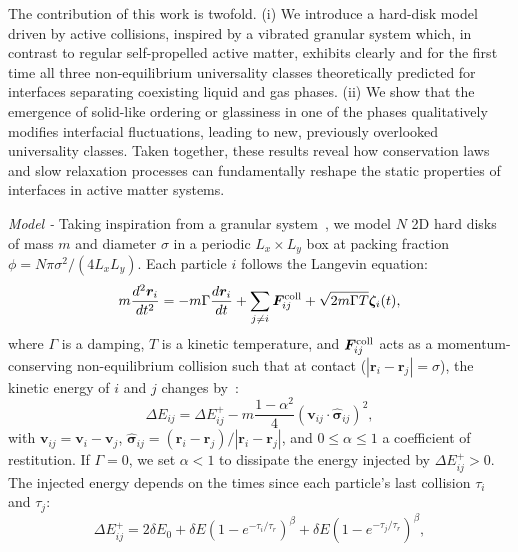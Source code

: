 \documentclass[aps,
reprint,
superscriptaddress,









amsmath,amssymb,floatfix,






prl
]{revtex4-2}
\begin{document}
The contribution of this work is twofold. (i) We introduce a hard-disk model driven by active collisions, inspired by a vibrated granular system which, in contrast to regular self-propelled active matter, exhibits clearly and for the first time all three non-equilibrium universality classes theoretically predicted for interfaces separating coexisting liquid and gas phases. (ii) We show that the emergence of solid-like ordering or glassiness in one of the phases qualitatively modifies interfacial fluctuations, leading to new, previously overlooked universality classes. Taken together, these results reveal how conservation laws and slow relaxation processes can fundamentally reshape the static properties of interfaces in active matter systems.

\emph{Model -} Taking inspiration from a granular system~\cite{maire2024non, maire2025dynamical}, we model $N$ 2D hard disks of mass $m$ and diameter $\sigma$ in a periodic $L_x\times L_y$ box at packing fraction $\phi = N\pi\sigma^2/(4L_xL_y)$. Each particle $i$ follows the Langevin equation:
\begin{equation}
m\dfrac{d^2\bm r_i}{dt^2}=-m\Gamma \dfrac{d\bm r_i}{dt} + \sum_{j\neq i}\bm F_{ij}^{\rm coll}+\sqrt{2m\Gamma T}\bm \zeta_i(t),
\label{eq: time evol}
\end{equation}
where $\Gamma$ is a damping, $T$ is a kinetic temperature, and $\bm F_{ij}^{\rm coll}$ acts as a momentum-conserving non-equilibrium collision such that at contact ($|\bm r_i - \bm r_j| = \sigma$), the kinetic energy of $i$ and $j$ changes by~\cite{risso2018effective, maire2025hyperuniform}:
\begin{equation}
\Delta E_{ij} = \Delta E_{ij}^+-m\dfrac{1-\alpha^2}{4}(\bm v_{ij}\cdot \hat{\bm\sigma}_{ij})^2,
\label{eq: energy change at collision}
\end{equation}
with $\bm v_{ij}=\bm v_{i}-\bm v_{j}$, $\hat{\bm\sigma}_{ij}=(\bm r_i - \bm r_j)/|\bm r_i - \bm r_j|$, and $0\leq\alpha \leq1$ a coefficient of restitution. If $\Gamma = 0$, we set $\alpha < 1$ to dissipate the energy injected by $\Delta E_{ij}^+>0$. The injected energy depends on the times since each particle’s last collision $\tau_i$ and $\tau_j$:
\begin{equation}
\Delta E^+_{ij} = 2\delta E_0 + \delta E\left(1 - e^{-\tau_i/\tau_r}\right)^\beta + \delta E\left(1 - e^{-\tau_j/\tau_r}\right)^\beta,
\label{eq: energy recharging}
\end{equation}
\end{document}
